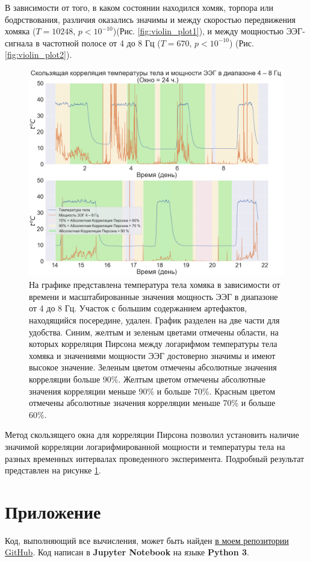 \documentclass[12pt,a4paper,oneside]{article}
\begin{document}
В зависимости от того, в каком состоянии находился хомяк, торпора или бодрствования, различия оказались значимы и между скоростью передвижения хомяка ($T = 10248$, $p < 10^{-10}$)(Рис. \ref{fig:violin_plot1}), и между мощностью ЭЭГ-сигнала в частотной полосе от 4 до 8 Гц ($T = 670$, $p < 10^{-10}$) (Рис. \ref{fig:violin_plot2}). 

\begin{figure}[H]
\centering
\includegraphics[width=0.7\linewidth]{moving_correlation.png}
\caption{На графике представлена температура тела хомяка в зависимости от времени и масштабированные значения мощность ЭЭГ в диапазоне от 4 до 8 Гц. Участок с большим содержанием артефактов, находящийся посередине, удален. График разделен на две части для удобства. Синим, желтым и зеленым цветами отмечены области, на которых корреляция Пирсона между логарифмом температуры тела хомяка и значениями мощности ЭЭГ достоверно значимы и имеют высокое значение. Зеленым цветом отмечены абсолютные значения корреляции больше 90\%. Желтым цветом отмечены абсолютные значения корреляции меньше 90\% и больше 70\%. Красным цветом отмечены абсолютные значения корреляции меньше 70\% и больше 60\%. }\label{fig:moving_correlation}
\end{figure}

Метод скользящего окна для корреляции Пирсона позволил установить наличие значимой корреляции логарифмированной мощности и температуры тела на разных временных интервалах проведенного эксперимента. Подробный результат представлен на рисунке \ref{fig:moving_correlation}.

\section{Приложение}

Код, выполняющий все вычисления, может быть найден \href{https://github.com/BasilMinkov/Jupyter-Notebooks/blob/master/HamsterEEG.ipynb}{в моем репозитории GitHub}. Код написан в \textbf{Jupyter Notebook} на языке \textbf{Python 3}.



\end{document}
